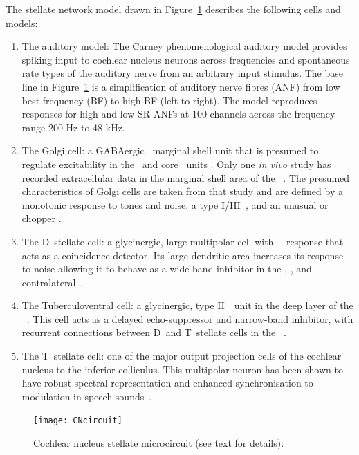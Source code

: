 The stellate network model drawn in Figure~\ref{fig:microcircuit} describes the
following cells and models:
\begin{enumerate}
\item The auditory model: The Carney phenomenological auditory model
  \citep{ZilanyBruceEtAl:2009} provides spiking input to cochlear nucleus
  neurons across frequencies and spontaneous rate types of the auditory nerve
  from an arbitrary input stimulus.  The base line in
  Figure~\ref{fig:microcircuit} is a simplification of auditory nerve fibres
  (ANF) from low best frequency (BF) to high BF (left to right).  The model
  reproduces responses for high and low SR ANFs at 100 channels across the
  frequency range 200 Hz to 48 kHz.
\item The Golgi cell: a {GABA}ergic \VCN~marginal shell unit that is presumed to
  regulate excitability in the \GCD~and core \VCN~units
  \citep{FerragamoGoldingEtAl:1998}.  Only one \textit{in vivo} study has
  recorded extracellular data in the marginal shell area of the
  \CN~\citep{GhoshalKim:1997}.  The presumed characteristics of Golgi cells are
  taken from that study and are defined by a monotonic response to tones and
  noise, a type I\slash III~\EIRA, and an unusual or chopper {\PSTH}.
\item The D~stellate cell: a glycinergic, large multipolar cell with
  \OnC~\PSTH~response that acts as a coincidence detector.  Its large dendritic
  area increases its response to noise allowing it to behave as a wide-band
  inhibitor in the \VCN, \DCN, and
  contralateral\CN~\citep{SmithMassieEtAl:2005,ArnottWallaceEtAl:2004,NeedhamPaolini:2007}.
\item The Tuberculoventral cell: a glycinergic, type II~{\EIRA}~unit in the deep
  layer of the \DCN~\citep{SpirouDavisEtAl:1999}.  This cell acts as a delayed
  echo-suppressor and narrow-band inhibitor, with recurrent connections between
  D~and T~stellate cells in the
  \VCN~\citep{Alibardi:2006,OertelWickesberg:1993,WickesbergWhitlonEtAl:1991}.
\item The T~stellate cell: one of the major output projection cells of the
  cochlear nucleus to the inferior colliculus.  This multipolar neuron has been
  shown to have robust spectral representation and enhanced synchronisation to
  modulation in speech
  sounds~\citep{BlackburnSachs:1990,KeilsonRichardsEtAl:1997}.
\end{enumerate}

\begin{figure}[htb]
  \centering
  \texttt{[image: CNcircuit]}
  \caption[Cochlear nucleus stellate microcircuit]{Cochlear nucleus stellate
    microcircuit (see text for details). }
  \label{fig:microcircuit}
\end{figure}


